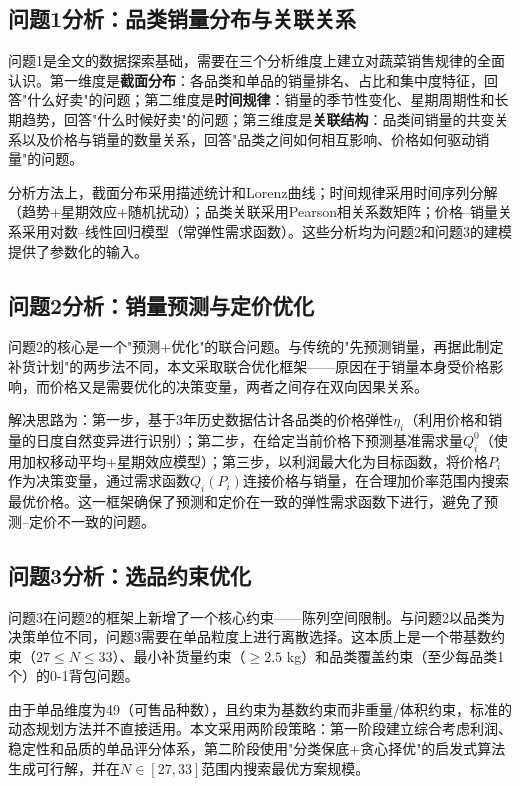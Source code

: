 \documentclass[12pt,a4paper]{ctexart}
\begin{document}
\subsection{问题1分析：品类销量分布与关联关系}

问题1是全文的数据探索基础，需要在三个分析维度上建立对蔬菜销售规律的全面认识。第一维度是\textbf{截面分布}：各品类和单品的销量排名、占比和集中度特征，回答"什么好卖"的问题；第二维度是\textbf{时间规律}：销量的季节性变化、星期周期性和长期趋势，回答"什么时候好卖"的问题；第三维度是\textbf{关联结构}：品类间销量的共变关系以及价格与销量的数量关系，回答"品类之间如何相互影响、价格如何驱动销量"的问题。

分析方法上，截面分布采用描述统计和Lorenz曲线；时间规律采用时间序列分解（趋势+星期效应+随机扰动）；品类关联采用Pearson相关系数矩阵；价格--销量关系采用对数--线性回归模型（常弹性需求函数）。这些分析均为问题2和问题3的建模提供了参数化的输入。

\subsection{问题2分析：销量预测与定价优化}

问题2的核心是一个"预测+优化"的联合问题。与传统的"先预测销量，再据此制定补货计划"的两步法不同，本文采取联合优化框架——原因在于销量本身受价格影响，而价格又是需要优化的决策变量，两者之间存在双向因果关系。

解决思路为：第一步，基于3年历史数据估计各品类的价格弹性$\eta_i$（利用价格和销量的日度自然变异进行识别）；第二步，在给定当前价格下预测基准需求量$Q_i^0$（使用加权移动平均+星期效应模型）；第三步，以利润最大化为目标函数，将价格$P_i$作为决策变量，通过需求函数$Q_i(P_i)$连接价格与销量，在合理加价率范围内搜索最优价格。这一框架确保了预测和定价在一致的弹性需求函数下进行，避免了预测--定价不一致的问题。

\subsection{问题3分析：选品约束优化}

问题3在问题2的框架上新增了一个核心约束——陈列空间限制。与问题2以品类为决策单位不同，问题3需要在单品粒度上进行离散选择。这本质上是一个带基数约束（$27 \le N \le 33$）、最小补货量约束（$\ge 2.5$ kg）和品类覆盖约束（至少每品类1个）的0-1背包问题。

由于单品维度为49（可售品种数），且约束为基数约束而非重量/体积约束，标准的动态规划方法并不直接适用。本文采用两阶段策略：第一阶段建立综合考虑利润、稳定性和品质的单品评分体系，第二阶段使用"分类保底+贪心择优"的启发式算法生成可行解，并在$N \in [27,33]$范围内搜索最优方案规模。
\end{document}
